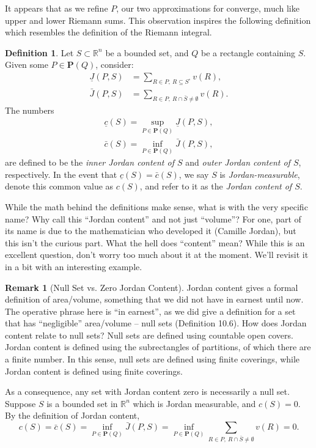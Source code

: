 \documentclass{article}
\newcommand{\R}{\mathbb{R}}
\theoremstyle{definition}
\newtheorem{definition}{Definition}[section]
\newtheorem{remark}{Remark}[section]
\begin{document}
	It appears that as we refine $ P $, our two approximations for converge, much like upper and lower Riemann sums. This observation inspires the following definition which resembles the definition of the Riemann integral.
	
	\begin{definition}\label{def}
		Let $ S\subset \R^n $ be a bounded set, and $ Q $ be a rectangle containing $ S $. Given some $ P\in \mathbf P(Q) $, consider:
		\begin{align*}
			\underline J(P,S) &= \sum_{R\in P,\ R\subseteq S^\circ} v(R),\\
			\bar J(P,S) & = \sum_{R\in P,\ R\cap \bar S\neq \emptyset}v(R).
		\end{align*}
	The numbers 
	\begin{align*}
		\underline c(S) = \sup_{P\in \textbf{P}(Q)} \underline{J}(P,S),\\ 
		\bar c(S) = \inf_{P\in \textbf{P}(Q)} \bar {J}(P,S),
	\end{align*}
	are defined to be the  \textit{\color{red}inner Jordan content of $ S $} and \textit{\color{red}outer Jordan content of $ S $}, respectively. In the event that $  \underline c(S) = \bar c(S)$, we say $ S $ is \textit{\color{red}Jordan-measurable},  denote this common value as $ c(S) $, and refer to it as the \textit{\color{red}Jordan content of $ S $}.
	\end{definition}
	While the math behind the definitions make sense, what is with the very specific name? Why call this ``Jordan content'' and not just ``volume''? For one, part of its name is due to the mathematician who developed it (Camille Jordan), but this isn't the curious part. What the hell does ``content'' mean? While this is an excellent question, don't worry too much about it at the moment. We'll revisit it in a bit with an interesting example. 
	
	\begin{remark}[Null Set vs. Zero Jordan Content]
		Jordan content gives a formal definition of area/volume, something that we did not have in earnest until now. The operative phrase here is ``in earnest'', as we did give a definition for a set that has ``negligible'' area/volume -- null sets (Definition 10.6). How does Jordan content relate to null sets? Null sets are defined using countable open covers. Jordan content is defined using the subrectangles of partitions, of which there are a finite number. In this sense, null sets are defined using finite coverings, while Jordan content is defined using finite coverings. 
		
		As a consequence, any set with Jordan content zero is necessarily a null set.  Suppose $ S $ is a bounded set in $ \R^n $ which is Jordan measurable, and $ c(S) = 0 $. By the definition of Jordan content, 
		$$	c(S) = \bar c(S) = \inf_{P\in \textbf{P}(Q)}\bar J(P,S)  = \inf_{P\in \textbf{P}(Q)}\sum_{R\in P,\ R\cap \bar S\neq \emptyset}v(R)= 0.$$
	\end{remark}
	
\end{document}
